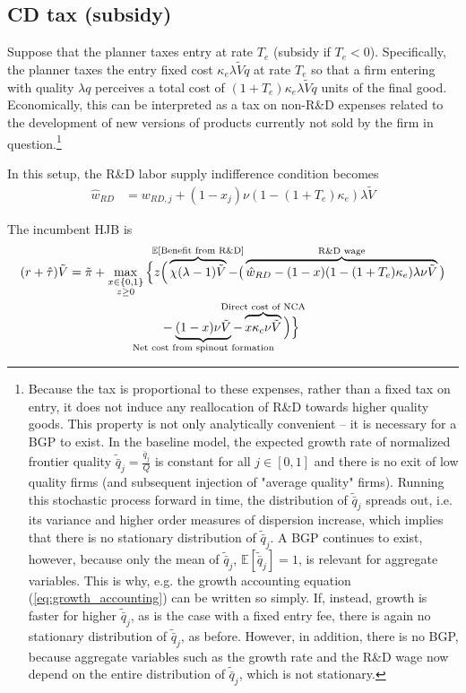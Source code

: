 \documentclass[11pt,english]{article}
\begin{document}
\subsection{CD tax (subsidy)}\label{subsec:cd_tax}

Suppose that the planner taxes entry at rate $T_e$ (subsidy if $T_e < 0$). Specifically, the planner taxes the entry fixed cost $\kappa_e \lambda \tilde{V} q$ at rate $T_e$ so that a firm entering with quality $\lambda q$ perceives a total cost of $(1+T_e) \kappa_e \lambda \tilde{V}q$ units of the final good. Economically, this can be interpreted as a tax on non-R\&D expenses related to the development of new versions of products currently not sold by the firm in question.\footnote{Because the tax is proportional to these expenses, rather than a fixed tax on entry, it does not induce any reallocation of R\&D towards higher quality goods. This property is not only analytically convenient -- it is necessary for a BGP to exist. In the baseline model, the expected growth rate of normalized frontier quality $\tilde{\bar{q}}_j = \frac{\bar{q}_j}{Q}$ is constant for all $j \in [0,1]$ and there is no exit of low quality firms (and subsequent injection of "average quality" firms). Running this stochastic process forward in time, the distribution of $\tilde{\bar{q}}_j$ spreads out, i.e. its variance and higher order measures of dispersion increase, which implies that there is no stationary distribution of $\tilde{\bar{q}}_j$. A BGP continues to exist, however, because only the mean of $\tilde{\bar{q}}_j$, $\mathbb{E}[\tilde{\bar{q}}_j] = 1$, is relevant for aggregate variables. This is why, e.g. the growth accounting equation (\ref{eq:growth_accounting}) can be written so simply. If, instead, growth is faster for higher $\tilde{\bar{q}}_j$, as is the case with a fixed entry fee, there is again no stationary distribution of $\tilde{\bar{q}}_j$, as before. However, in addition, there is no BGP, because aggregate variables such as the growth rate and the R\&D wage now depend on the entire distribution of $\tilde{\bar{q}}_j$, which is not stationary.}

In this setup, the R\&D labor supply indifference condition becomes
\begin{align}
	\hat{w}_{RD} &= w_{RD,j} + (1-x_j) \nu (1-(1+T_e)\kappa_e) \lambda \tilde{V} \label{eq:RD_worker_indifference_entryTax}
\end{align}

The incumbent HJB is
\begin{align}
(r + \hat{\tau}) \tilde{V} = \tilde{\pi} + \max_{\substack{x \in \{0,1\} \\ z \ge 0}} \Big\{z &\Big( \overbrace{\chi (\lambda - 1) \tilde{V}}^{\mathclap{\mathbb{E}[\textrm{Benefit from R\&D}]}}-  \big( \overbrace{\hat{w}_{RD} - (1-x)(1-(1+T_e)\kappa_e)\lambda \nu \tilde{V}}^{\mathclap{\text{R\&D wage}}}\big) \label{eq:hjb_incumbent_entryTax} \nonumber \\ 
&-  \underbrace{(1-x) \nu \tilde{V}}_{\mathclap{\text{Net cost from spinout formation}}} - \overbrace{x \kappa_{c} \nu \tilde{V}}^{\mathclap{\text{Direct cost of NCA}}}\Big) \Big\} 
\end{align}
\end{document}
